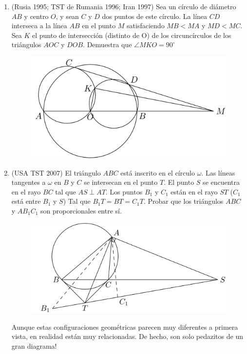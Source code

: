 \documentclass[11pt, a4paper]{article}
\begin{document}
\begin{enumerate}
\begin{figure}[h]
	\end{figure}
	\item (Rusia 1995; TST de Rumania 1996; Iran 1997) Sea un c\'irculo de di\'ametro $AB$ y centro $O$, y sean $C$ y $D$ dos puntos de este c\'irculo. La l\'inea $CD$ interseca a la l\'inea $AB$ en el punto $M$ satisfaciendo $MB < MA$ y $MD < MC$. Sea $K$ el punto de intersecci\'on (distinto de O) de los circunc\'irculos de los tri\'angulos $AOC$ y $DOB$. Demuestra que $\angle MKO = 90^{\circ}$
		\newpage
	\begin{figure}[h!]
		\centering
		\includegraphics[scale=0.18]{p1.2}
	\end{figure}
	\item (USA TST 2007) El tri\'angulo $ABC$ est\'a inscrito en el c\'irculo $\omega$. Las l\'ineas tangentes a $\omega$ en $B$ y $C$ se intersecan en el punto $T$. El punto $S$ se encuentra en el rayo $BC$ tal que $AS \perp AT$. Los puntos $B_1$ y $C_1$ est\'an en el rayo $ST$ ($C_1$ est\'a entre $B_1$ y $S$) Tal que $B_1T = BT = C_1T$. Probar que los tri\'angulos $ABC$ y $AB_1C_1$ son proporcionales entre s\'i.
	\begin{figure}[h]
		\centering
		\includegraphics[scale=0.2]{p1.3}
	\end{figure}
	Aunque estas configuraciones geom\'etricas parecen muy diferentes a primera vista, en realidad est\'an muy relacionadas. De hecho, son solo pedazitos de un gran diagrama!
\newpage

\end{enumerate}
\end{document}
